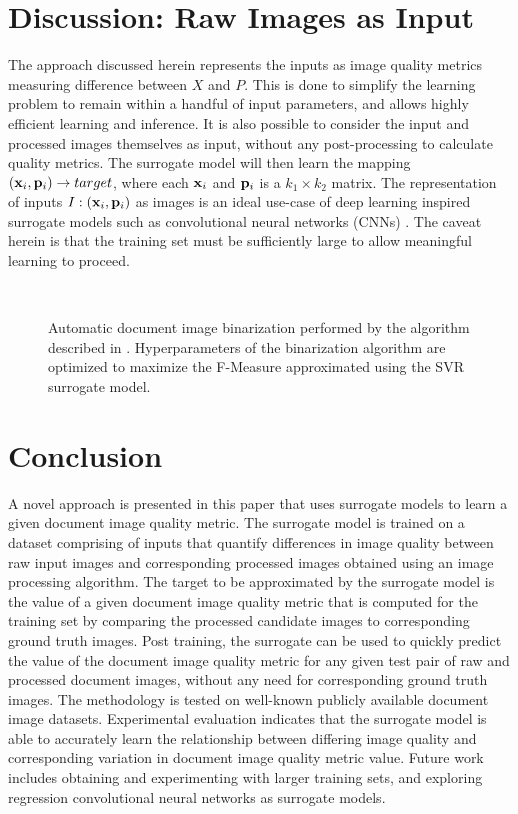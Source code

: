 \documentclass[10pt, a4paper, conference, compsocconf]{IEEEtran}
\begin{document}
\section{Discussion: Raw Images as Input}
\label{sec:discussion}
The approach discussed herein represents the inputs as image quality metrics measuring difference between $X$ and $P$. This is done to simplify the learning problem to remain within a handful of input parameters, and allows highly efficient learning and inference.
It is also possible to consider the input and processed images themselves as input, without any post-processing to calculate quality metrics. The surrogate model will then learn the mapping $({\bf x}_i, {\bf p}_i) \rightarrow target$, where each ${\bf x}_i$ and ${\bf p}_i$ is a $k_1 \times k_2$ matrix. The representation of inputs $I: ({\bf x}_i, {\bf p}_i)$ as images is an ideal use-case of deep learning inspired surrogate models such as convolutional neural networks (CNNs) \cite{krizhevsky2012imagenet}. The caveat herein is that the training set must be sufficiently large to allow meaningful learning to proceed.

\begin{figure}[!t]
  \centering
\\
\caption{Automatic document image binarization performed by the algorithm described in \cite{vats2017automatic}. Hyperparameters of the binarization algorithm are optimized to maximize the F-Measure approximated using the SVR surrogate model.}
\label{fig_binRes}
\end{figure}

\section{Conclusion}
\label{sec:conclusion}
A novel approach is presented in this paper that uses surrogate models to learn a given document image quality metric. The surrogate model is trained on a dataset comprising of inputs that quantify differences in image quality between raw input images and corresponding processed images obtained using an image processing algorithm. The target to be approximated by the surrogate model is the value of a given document image quality metric that is computed for the training set by comparing the processed candidate images to corresponding ground truth images. Post training, the surrogate can be used to quickly predict the value of the document image quality metric for any given test pair of raw and processed document images, without any need for corresponding ground truth images. The methodology is tested on well-known publicly available document image datasets. Experimental evaluation indicates that the surrogate model is able to accurately learn the relationship between differing image quality and corresponding variation in document image quality metric value. Future work includes obtaining and experimenting with larger training sets, and exploring regression convolutional neural networks as surrogate models.
\end{document}
